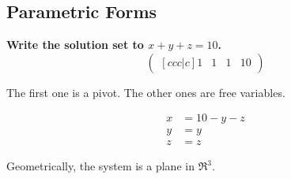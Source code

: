 \subsection{Parametric Forms}
\textbf{Write the solution set to \(x+y+z=10\).}
\begin{equation}
    \begin{pmatrix}[ccc|c]
        1 & 1 & 1 & 10
    \end{pmatrix}
\end{equation}

\noindent
\newline
The first one is a pivot. The other ones are free variables.

\begin{align}
    x &= 10 - y - z \\
    y &= y \\
    z &= z
\end{align}

\noindent
\newline
Geometrically, the system is a plane in \(\Re^3\).